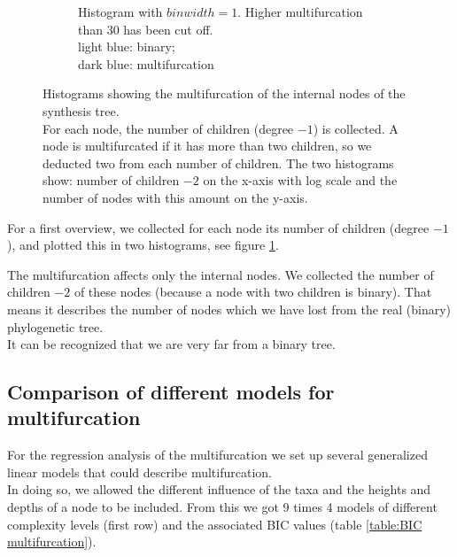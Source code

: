 \begin{figure}[h!]
\begin{subfigure}[b]{0.4\textwidth}
        \caption{Histogram with $binwidth = 1$. Higher multifurcation than 30 has been cut off. \\
          light blue: binary; \\ dark blue: multifurcation}
      \end{subfigure}
      \caption{Histograms showing the multifurcation of the internal nodes of the synthesis tree. \\
        For each node, the number of children (degree $-1$) is collected. A node is multifurcated 
        if it has more than two children, so we deducted two from each number of children. The two 
        histograms show: number of children $-2$ on the x-axis with log scale and the number of nodes 
        with this amount on the y-axis.}
      \label{fig:childrenOfNodes}
    \end{figure}

    For a first overview, we collected for each node its number of children (degree $-1$), 
      and plotted this in two histograms, see figure \ref{fig:childrenOfNodes}.

    The multifurcation affects only the internal nodes. We collected the number of children $-2$ of 
      these nodes (because a node with two children is binary). That means it describes the number of 
      nodes which we have lost from the real (binary) phylogenetic tree. \\
    It can be recognized that we are very far from a binary tree.

    \subsection{Comparison of different models for multifurcation}
      For the regression analysis of the multifurcation we set up several generalized linear models that 
        could describe multifurcation. \\
      In doing so, we allowed the different influence of the taxa and the heights and depths of a node 
        to be included. From this we got 9 times 4 models of different complexity levels (first row) and 
        the associated BIC values (table \ref{table:BIC multifurcation}).

